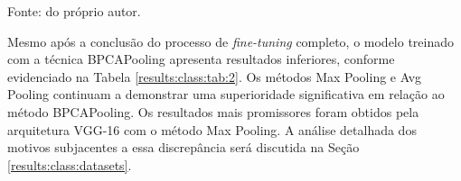 \begin{table}[H]
    \centering
    \caption{Resultados da fase de aquecimento de VGG-16 aplicada no conjunto de dados CIFAR 100.}
    \label{results:class:tab:1}

    \vspace*{1 cm}
    Fonte: do próprio autor.
\end{table}

Mesmo após a conclusão do processo de \textit{fine-tuning} completo, o modelo treinado com a técnica BPCAPooling apresenta resultados inferiores, conforme evidenciado na Tabela \ref{results:class:tab:2}. Os métodos Max Pooling e Avg Pooling continuam a demonstrar uma superioridade significativa em relação ao método BPCAPooling. Os resultados mais promissores foram obtidos pela arquitetura VGG-16 com o método Max Pooling. A análise detalhada dos motivos subjacentes a essa discrepância será discutida na Seção \ref{results:class:datasets}.

